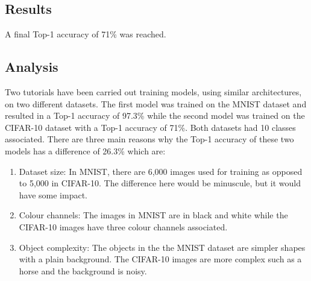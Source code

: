 \tocless\subsection{Results}
A final Top-1 accuracy of 71\% was reached.

\tocless\subsection{Analysis}
Two tutorials have been carried out training models, using similar architectures, on two different datasets.
The first model was trained on the MNIST dataset and resulted in a Top-1 accuracy of 97.3\% while the second model was trained on the CIFAR-10 dataset with a Top-1 accuracy of 71\%.
Both datasets had 10 classes associated.
There are three main reasons why the Top-1 accuracy of these two models has a difference of 26.3\% which are:
\begin{enumerate}
    \item{Dataset size: In MNIST, there are 6,000 images used for training as opposed to 5,000 in CIFAR-10. The difference here would be minuscule, but it would have some impact.}
    \item{Colour channels: The images in MNIST are in black and white while the CIFAR-10 images have three colour channels associated.}
    \item{Object complexity: The objects in the the MNIST dataset are simpler shapes with a plain background. The CIFAR-10 images are more complex such as a horse and the background is noisy.}
\end{enumerate}

\clearpage
